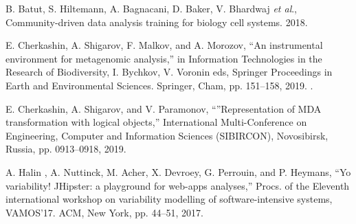 \documentclass[a4paper]{jpconf}
\begin{document}
\begin{thebibliography}{0}

 B. Batut, S. Hiltemann, A. Bagnacani, D. Baker, V. Bhardwaj \emph{et al}., Community-driven data analysis training for biology cell systems. 2018. 



 E. Cherkashin, A. Shigarov, F. Malkov, and A. Morozov, ``An instrumental environment for metagenomic analysis,'' in Information Technologies in the Research of Biodiversity, I. Bychkov, V. Voronin eds, Springer Proceedings in Earth and Environmental Sciences. Springer, Cham, pp. 151--158, 2019. .

  E. Cherkashin, A. Shigarov, and V. Paramonov, ``''Representation of MDA transformation with logical objects,'' International Multi-Conference on Engineering, Computer and Information Sciences (SIBIRCON), Novosibirsk, Russia, pp. 0913--0918, 2019. 

 A. Halin , A. Nuttinck, M. Acher, X. Devroey, G. Perrouin, and P. Heymans, ``Yo variability! JHipster: a playground for web-apps analyses,'' Procs. of the Eleventh international workshop on variability modelling of software-intensive systems, VAMOS’17. ACM, New York, pp. 44–51, 2017. 
















\end{thebibliography}
\end{document}
